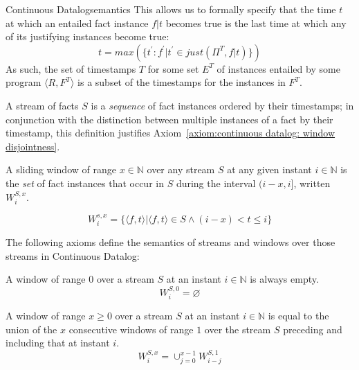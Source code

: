 \begin{nestedsection}{Continuous Datalog}{semantics}
This allows us to formally specify that the time $t$ at which an entailed fact
instance ${f | t}$ becomes true is the last time at which any of its
justifying instances become true:
\[ t = max(\{ t^\prime : f^\prime | t^\prime \in just(\Pi^T, f | t) \}) \]
As such, the set of timestamps $T$ for some set $E^T$ of instances entailed by some
program ${\langle R, F^T \rangle}$ is a subset of the timestamps for the instances in $F^T$.

\begin{definition}
A stream of facts $S$ is a \emph{sequence} of fact instances ordered
by their timestamps; in conjunction with the distinction between
multiple instances of a fact by their timestamp, this definition justifies
Axiom~\ref{axiom:continuous datalog: window disjointness}.
\end{definition}

\begin{definition}

A sliding window of range ${x \in \mathbb{N}}$ over any stream $S$ at
any given instant ${i \in \mathbb{N}}$ is the \emph{set} of fact
instances that occur in $S$ during the interval ${(i-x,i]}$, written
${W^{S,x}_{i}}$.

\[ W^{s,x}_i = \{ \langle f, t \rangle | \langle f, t \rangle \in S \land (i-x) < t \leqslant i \}\]  

\end{definition}

The following axioms define the semantics of streams and windows over
those streams in Continuous Datalog:

\begin{axiom}\label{axiom:continuous datalog: window range leq 0}
A window of range $0$ over a stream $S$ at an instant 
${i \in \mathbb{N}}$ is always empty.
\begin{equation*}
W^{S,0}_{i} = \varnothing
\end{equation*}
\end{axiom}

\begin{axiom}\label{axiom:continuous datalog: window composition}
A window of range ${x \ge 0}$ over a stream $S$ at an instant 
${i \in \mathbb{N}}$ is equal to the union of the $x$ consecutive
windows of range $1$ over the stream $S$ preceding and including that at
instant $i$.
\begin{equation*}
W^{S,x}_{i} = \mathop{\cup}_{j=0}^{x-1} W^{S,1}_{i-j}
\end{equation*}
\end{axiom}


\end{nestedsection}
